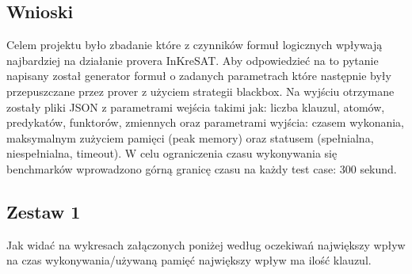 \documentclass[a4paper,12pt]{article}
\begin{document}
\begin{itemize}

%
\section{Wnioski}

Celem projektu było zbadanie które z czynników formuł logicznych wpływają najbardziej na działanie provera InKreSAT. Aby odpowiedzieć na to pytanie napisany został generator formuł o zadanych parametrach które następnie były przepuszczane przez prover z użyciem strategii blackbox. Na wyjściu otrzymane zostały pliki JSON z parametrami wejścia takimi jak: liczba klauzul, atomów, predykatów, funktorów, zmiennych oraz parametrami wyjścia: czasem wykonania, maksymalnym zużyciem pamięci (peak memory) oraz statusem (spełnialna, niespełnialna, timeout). W celu ograniczenia czasu wykonywania się benchmarków wprowadzono górną granicę czasu na każdy test case: 300 sekund.

\subsection{Zestaw 1}

Jak widać na wykresach załączonych poniżej według oczekiwań największy wpływ na czas wykonywania/używaną pamięć największy wpływ ma ilość klauzul.



\end{itemize}
\end{document}
